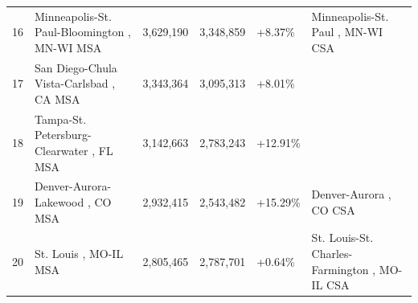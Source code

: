 \documentclass{article}
\begin{document}
\begin{tabular}{llllll}
16 & Minneapolis-St. Paul-Bloomington , MN-WI MSA & 3,629,190 & 3,348,859 & +8.37\% & Minneapolis-St. Paul , MN-WI CSA \\
17 & San Diego-Chula Vista-Carlsbad , CA MSA & 3,343,364 & 3,095,313 & +8.01\% &  \\
18 & Tampa-St. Petersburg-Clearwater , FL MSA & 3,142,663 & 2,783,243 & +12.91\% &  \\
19 & Denver-Aurora-Lakewood , CO MSA & 2,932,415 & 2,543,482 & +15.29\% & Denver-Aurora , CO CSA \\
20 & St. Louis , MO-IL MSA & 2,805,465 & 2,787,701 & +0.64\% & St. Louis-St. Charles-Farmington , MO-IL CSA \\
\bottomrule
\end{tabular}
\end{document}
